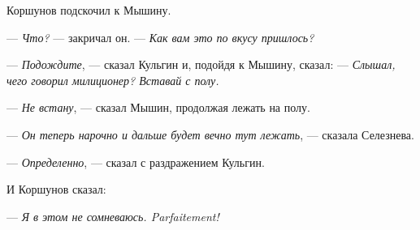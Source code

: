 Коршунов подскочил к Мышину.

--- \textit{Что?} --- закричал он. --- \textit{Как вам это по вкусу пришлось?}

--- \textit{Подождите}, --- сказал Кульгин и, подойдя к Мышину, сказал: --- \textit{Слышал, чего говорил милиционер? Вставай с полу.}

--- \textit{Не встану}, --- сказал Мышин, продолжая лежать на полу.

--- \textit{Он теперь нарочно и дальше будет вечно тут лежать}, --- сказала Селезнева.

--- \textit{Определенно}, --- сказал с раздражением Кульгин.

И Коршунов сказал:

--- \textit{Я в этом не сомневаюсь. Parfaitement!}
